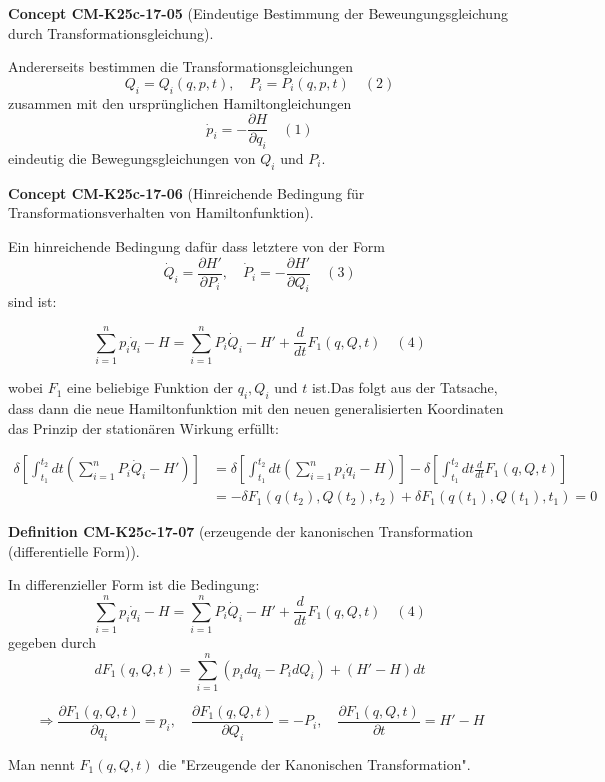 \documentclass[10pt, letterpaper]{article}
\newcommand{\CustomHeading}[3]{%
  \par\medskip\noindent%
  \textbf{#1 #2} \textnormal{(#3)}.\enskip%
}
\newenvironment{DEF}[2]{\begin{unitbox}\CustomHeading{Definition}{#1}{#2}}{\end{unitbox}}
\newenvironment{CONC}[2]{\begin{unitbox}\CustomHeading{Concept}{#1}{#2}}{\end{unitbox}}
\begin{document}
\begin{CONC}{CM-K25c-17-05}{Eindeutige Bestimmung der Beweungungsgleichung durch Transformationsgleichung}
Andererseits bestimmen die Transformationsgleichungen 
\[Q_i = Q_i(q,p,t), \quad P_i = P_i(q,p,t) \quad (2)\]
zusammen mit den ursprünglichen Hamiltongleichungen 
\[ \dot{p}_i = -\frac{\partial H}{\partial q_i} \quad (1)\]
eindeutig die Bewegungsgleichungen von $Q_i$ und $P_i$.
\end{CONC}

\begin{CONC}{CM-K25c-17-06}{Hinreichende Bedingung für Transformationsverhalten von Hamiltonfunktion}
Ein hinreichende Bedingung dafür dass letztere von der Form
\[\dot{Q}_i = \frac{\partial H'}{\partial P_i}, \quad \dot{P}_i = -\frac{\partial H'}{\partial Q_i} \quad (3)\]
sind ist:

\[\sum_{i=1}^n p_i\dot{q}_i - H = \sum_{i=1}^n P_i\dot{Q}_i - H' + \frac{d}{dt}F_1(q,Q,t) \quad (4)\]

wobei $F_1$ eine beliebige Funktion der $q_i, Q_i$ und $t$ ist.Das folgt aus der Tatsache, dass dann die neue Hamiltonfunktion mit den neuen generalisierten Koordinaten das Prinzip der stationären Wirkung erfüllt:

\begin{align*}
\delta\left[\int_{t_1}^{t_2} dt\left(\sum_{i=1}^n P_i\dot{Q}_i - H'\right)\right] &= \delta\left[\int_{t_1}^{t_2} dt\left(\sum_{i=1}^n p_i\dot{q}_i-H\right)\right] - \delta\left[\int_{t_1}^{t_2} dt\frac{d}{dt}F_1(q,Q,t)\right]\\
&= -\delta F_1(q(t_2),Q(t_2),t_2) + \delta F_1(q(t_1),Q(t_1),t_1) = 0
\end{align*}
\end{CONC}

\begin{DEF}{CM-K25c-17-07}{erzeugende der kanonischen Transformation (differentielle Form)}
In differenzieller Form ist die Bedingung:
\[\sum_{i=1}^n p_i\dot{q}_i - H = \sum_{i=1}^n P_i\dot{Q}_i - H' + \frac{d}{dt}F_1(q,Q,t) \quad (4)\]
gegeben durch 
\[dF_1(q,Q,t) = \sum_{i=1}^n (p_i dq_i - P_i dQ_i) + (H'-H)dt\]

\[\Rightarrow \frac{\partial F_1(q,Q,t)}{\partial q_i} = p_i, \quad \frac{\partial F_1(q,Q,t)}{\partial Q_i} = -P_i, \quad \frac{\partial F_1(q,Q,t)}{\partial t} = H'-H\]

Man nennt $F_1(q,Q,t)$ die "Erzeugende der Kanonischen Transformation".
\end{DEF}
\end{document}
